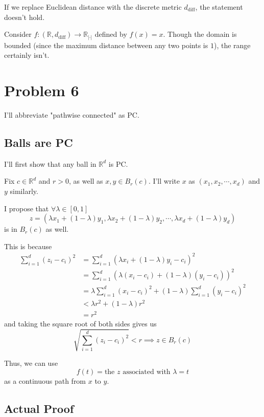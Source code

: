 \documentclass[12pt]{article}
\newcommand{\R}{\mathbb{R}}
\begin{document}
If we replace Euclidean distance with the discrete metric $d_\text{diff}$, the statement doesn't hold.

Consider $f: (\R, d_\text{diff}) \to \R_{|\cdot|}$ defined by $f(x)=x$.
Though the domain is bounded (since the maximum distance between any two points is $1$),
the range certainly isn't.

\pagebreak

\section{Problem 6}

I'll abbreviate "pathwise connected" as PC.

\subsection{Balls are PC}\label{sec:prob6lemma}

I'll first show that any ball in $\R^d$ is PC.

Fix $c \in \R^d$ and $r > 0$, as well as $x, y \in B_r(c)$.
I'll write $x$ as $(x_1, x_2, \cdots, x_d)$ and $y$ similarly.

I propose that $\forall \lambda \in [0, 1]$
\[z=(\lambda x_1 + (1-\lambda) y_1, \lambda x_2 + (1-\lambda) y_2, \cdots, \lambda x_d + (1-\lambda) y_d)\]
is in $B_r(c)$ as well.

This is because
\begin{align*}
  \sum_{i=1}^{d} (z_i-c_i)^2
  &= \sum_{i=1}^{d} (\lambda x_i + (1-\lambda) y_i - c_i)^2 \\
  &= \sum_{i=1}^{d} (\lambda (x_i - c_i) + (1-\lambda)(y_i-c_i))^2 \\
  &= \lambda \sum_{i=1}^{d} (x_i-c_i)^2 + (1-\lambda) \sum_{i=1}^{d} (y_i-c_i)^2 \\
  &< \lambda r^2 + (1-\lambda) r^2 \\
  &= r^2
\end{align*}
and taking the square root of both sides gives us
\[\sqrt{\sum_{i=1}^{d} (z_i-c_i)^2} < r \implies z \in B_r(c)\]

Thus, we can use
\[f(t)=\text{the $z$ associated with $\lambda=t$}\]
as a continuous path from $x$ to $y$.

\pagebreak

\subsection{Actual Proof}
\end{document}
